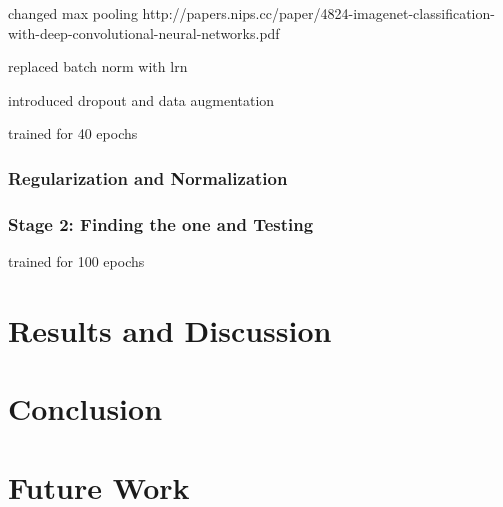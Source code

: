 \documentclass[]{article}
\begin{document}
changed max pooling
http://papers.nips.cc/paper/4824-imagenet-classification-with-deep-convolutional-neural-networks.pdf

replaced batch norm with lrn

introduced dropout and data augmentation

trained for 40 epochs

\subsubsection{Regularization and Normalization}


\subsubsection{Stage 2: Finding the one and Testing}

trained for 100 epochs
 
 
\section{Results and Discussion}

\section{Conclusion}

\section{Future Work}


\clearpage
\medskip


\end{document}
